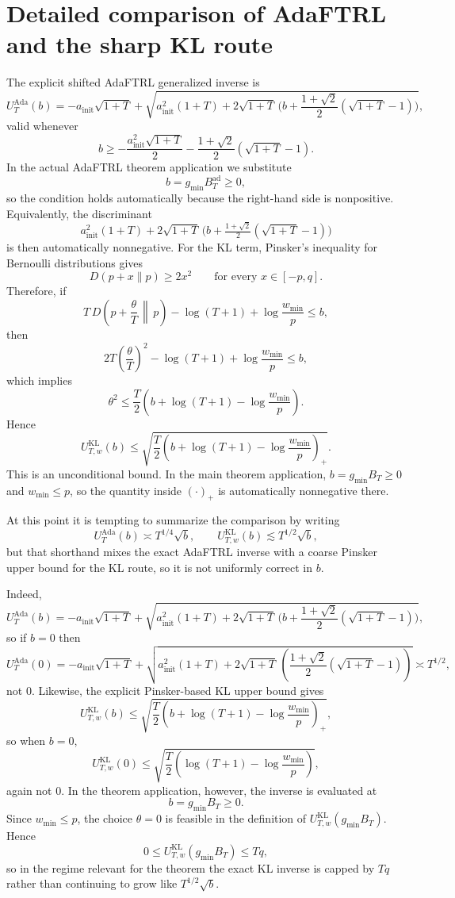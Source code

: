 \documentclass[11pt]{article}
\newcommand{\1}{\mathbf{1}}
\begin{document}
\section{Detailed comparison of AdaFTRL and the sharp KL route}
\label{app:comparison-details}

The explicit shifted AdaFTRL generalized inverse is
\[
U_T^{\mathrm{Ada}}(b)
=
-a_{\mathrm{init}}\sqrt{1+T}
+
\sqrt{
a_{\mathrm{init}}^2(1+T)
+
2\sqrt{1+T}\,\bigl(b+\frac{1+\sqrt{2}}{2}(\sqrt{1+T}-1)\bigr)
},
\]
valid whenever
\[
b\ge -\frac{a_{\mathrm{init}}^2\sqrt{1+T}}{2}-\frac{1+\sqrt{2}}{2}(\sqrt{1+T}-1).
\]
In the actual AdaFTRL theorem application we substitute
\[
b=g_{\min}B_T^{\mathrm{ad}}\ge 0,
\]
so the condition holds automatically because the right-hand side is nonpositive. Equivalently, the discriminant
\[
a_{\mathrm{init}}^2(1+T)+2\sqrt{1+T}\,\bigl(b+\tfrac{1+\sqrt{2}}{2}(\sqrt{1+T}-1)\bigr)
\]
is then automatically nonnegative.
For the KL term, Pinsker's inequality for Bernoulli distributions gives
\[
D(p+x\|p)\ge 2x^2
\qquad\text{for every }x\in[-p,q].
\]
Therefore, if
\[
T\,D\!\left(p+\frac{\theta}{T}\,\middle\|\,p\right)-\log(T+1)+\log\frac{w_{\min}}{p}\le b,
\]
then
\[
2T\left(\frac{\theta}{T}\right)^2-\log(T+1)+\log\frac{w_{\min}}{p}\le b,
\]
which implies
\[
\theta^2\le \frac{T}{2}\left(b+\log(T+1)-\log\frac{w_{\min}}{p}\right).
\]
Hence
\[
U_{T,w}^{\mathrm{KL}}(b)
\le
\sqrt{\frac{T}{2}\left(b+\log(T+1)-\log\frac{w_{\min}}{p}\right)_+}.
\]
This is an unconditional bound. In the main theorem application, $b=g_{\min}B_T\ge 0$ and $w_{\min}\le p$, so the quantity inside $(\cdot)_+$ is automatically nonnegative there.

At this point it is tempting to summarize the comparison by writing
\[
U_T^{\mathrm{Ada}}(b)\asymp T^{1/4}\sqrt{b},
\qquad
U_{T,w}^{\mathrm{KL}}(b)\lesssim T^{1/2}\sqrt{b},
\]
but that shorthand mixes the exact AdaFTRL inverse with a coarse Pinsker upper bound for the KL route, so it is not uniformly correct in \(b\).

Indeed,
\[
U_T^{\mathrm{Ada}}(b)
=
-a_{\mathrm{init}}\sqrt{1+T}
+
\sqrt{
a_{\mathrm{init}}^2(1+T)
+
2\sqrt{1+T}\,\bigl(b+\frac{1+\sqrt{2}}{2}(\sqrt{1+T}-1)\bigr)
},
\]
so if \(b=0\) then
\[
U_T^{\mathrm{Ada}}(0)
=
-a_{\mathrm{init}}\sqrt{1+T}
+
\sqrt{
a_{\mathrm{init}}^2(1+T)
+
2\sqrt{1+T}\,(\frac{1+\sqrt{2}}{2}(\sqrt{1+T}-1))
}
\asymp T^{1/2},
\]
not \(0\). Likewise, the explicit Pinsker-based KL upper bound gives
\[
U_{T,w}^{\mathrm{KL}}(b)
\le
\sqrt{\frac{T}{2}\left(b+\log(T+1)-\log\frac{w_{\min}}{p}\right)_+},
\]
so when \(b=0\),
\[
U_{T,w}^{\mathrm{KL}}(0)\le \sqrt{\frac{T}{2}\left(\log(T+1)-\log\frac{w_{\min}}{p}\right)},
\]
again not \(0\). In the theorem application, however, the inverse is evaluated at
\[
b=g_{\min}B_T\ge 0.
\]
Since \(w_{\min}\le p\), the choice \(\theta=0\) is feasible in the definition of \(U_{T,w}^{\mathrm{KL}}(g_{\min}B_T)\). Hence
\[
0\le U_{T,w}^{\mathrm{KL}}(g_{\min}B_T)\le Tq,
\]
so in the regime relevant for the theorem the exact KL inverse is capped by \(Tq\) rather than continuing to grow like \(T^{1/2}\sqrt b\).
\end{document}
